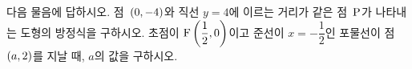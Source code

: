 다음 물음에 답하시오.
 점~$(0{,}\mkern3mu\mathopen{}-4)$와 직선 $y=4$에 이르는 거리가 같은 점~$\mathrm{P}$가 나타내는 도형의 방정식을 구하시오.
 초점이 $\mathrm{F}\left(\dfrac{1}{2}{,}\mkern3mu\mathopen{}0\right)$이고 준선이 $x=-\dfrac{1}{2}$인 포물선이 점~$(a{,}\mkern3mu\mathopen{}2)$를 지날 때, $a$의 값을 구하시오.
